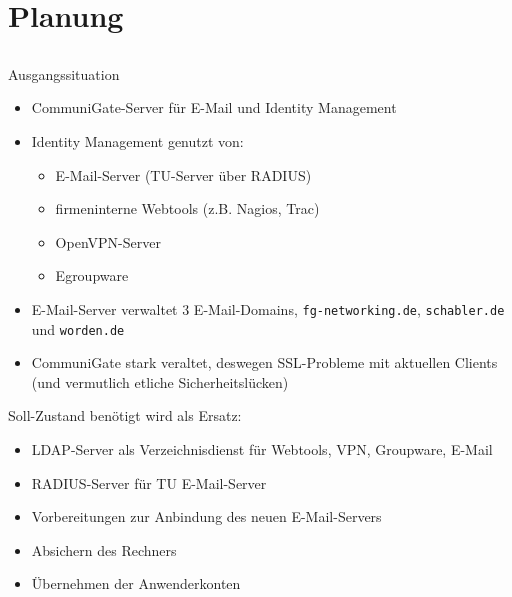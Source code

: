 \documentclass[handout,svgnames]{beamer}
\begin{document}
\section{Planung}
\subsection{}
\begin{frame}{Ausgangssituation}
\begin{itemize}
	\item CommuniGate-Server für E-Mail und Identity Management
	\item Identity Management genutzt von:
	\begin{itemize}
		\item E-Mail-Server (TU-Server über RADIUS)
		\item firmeninterne Webtools (z.B. Nagios, Trac)
		\item OpenVPN-Server
		\item Egroupware
	\end{itemize}
	\item E-Mail-Server verwaltet 3 E-Mail-Domains, \texttt{fg-networking.de}, \texttt{schabler.de} und \texttt{worden.de}
 	\item CommuniGate stark veraltet, deswegen SSL-Probleme mit aktuellen Clients (und vermutlich etliche Sicherheitslücken)
\end{itemize}
\end{frame}

\begin{frame}{Soll-Zustand}
benötigt wird als Ersatz:
\begin{itemize}
	\item LDAP-Server als Verzeichnisdienst für Webtools, VPN, Groupware, E-Mail
	\item RADIUS-Server für TU E-Mail-Server
	\item Vorbereitungen zur Anbindung des neuen E-Mail-Servers
	\item Absichern des Rechners
	\item Übernehmen der Anwenderkonten
\end{itemize}
\end{frame}
\end{document}
